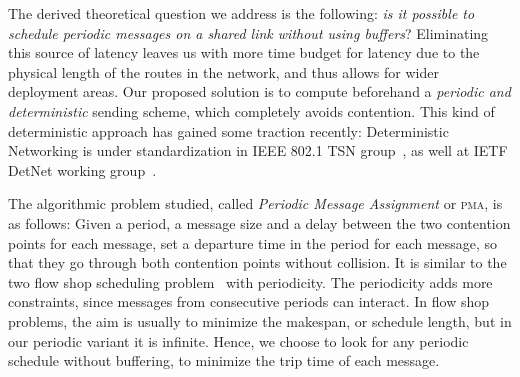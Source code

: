 \documentclass[a4paper,cleveref, autoref, thm-restate,UKenglish]{lipics-v2019}
\newcommand\pma{\textsc{pma}\xspace}
\begin{document}

The derived theoretical question we address is the following: \emph{is it possible to schedule periodic messages on a shared link without using buffers}? Eliminating this source of latency leaves us with more time budget for latency due to the physical length of the routes in the network, and thus allows for wider deployment areas. Our proposed solution is to compute beforehand a \emph{periodic and deterministic} sending scheme, which completely avoids contention. This kind of deterministic approach has gained some traction recently: Deterministic Networking is under standardization in IEEE 802.1 TSN group~\cite{finn-detnet-architecture-08}, as well at IETF DetNet working group~\cite{ieee802}. 

The algorithmic problem studied, called \emph{Periodic Message Assignment} or \pma, is as follows:
Given a period, a message size and a delay between the two contention points for each message, set a departure time in the period for each message, so that they go through both contention points without collision. It is similar to the two flow shop scheduling problem~\cite{yu2004minimizing} with periodicity. The periodicity adds more constraints, since messages from consecutive periods can interact. In flow shop problems, the aim is usually to minimize the makespan, or schedule length, but in our periodic variant it is infinite. Hence, we choose to look for any periodic schedule without buffering, to minimize the trip time of each message. 
\end{document}
